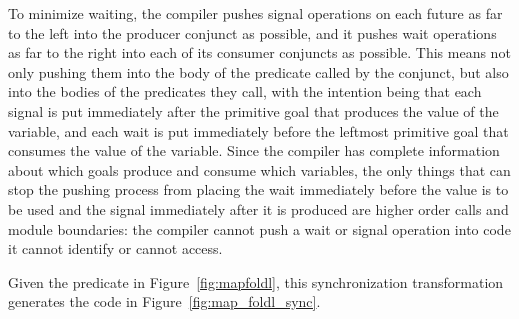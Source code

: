 To minimize waiting,
the compiler pushes signal operations on each future
as far to the left into the producer conjunct as possible,
and it pushes wait operations
as far to the right into each of its consumer conjuncts as possible.
This means not only pushing them
into the body of the predicate called by the conjunct,
but also into the bodies of the predicates they call,
with the intention being that
each signal is put immediately after
the primitive goal that produces the value of the variable,
and each wait is put immediately before
the leftmost primitive goal that consumes the value of the variable.
Since the compiler has complete information
about which goals produce and consume which variables,
the only things that can stop the pushing process from placing the
wait immediately before the value is to be used and the signal
immediately after it is produced are
higher order calls and module boundaries:
the compiler cannot push a wait or signal operation
into code it cannot identify or cannot access.


Given the \mapfoldl predicate in Figure~\ref{fig:mapfoldl},
this synchronization transformation
generates the code in Figure~\ref{fig:map_foldl_sync}.


